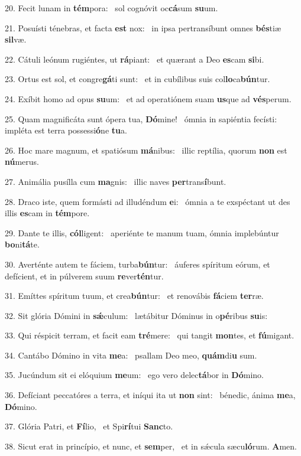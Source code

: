 20. Fecit lunam in \textbf{tém}pora: \ast\  sol cognóvit oc\textbf{cá}sum \textbf{su}um.\

21. Posuísti ténebras, et facta \textbf{est} nox: \ast\  in ipsa pertransíbunt omnes \textbf{bés}tiæ \textbf{sil}væ.\

22. Cátuli leónum rugiéntes, ut \textbf{rá}piant: \ast\  et quærant a Deo \textbf{es}cam \textbf{si}bi.\

23. Ortus est sol, et congre\textbf{gá}ti sunt: \ast\  et in cubílibus suis col\textbf{lo}ca\textbf{bún}tur.\

24. Exíbit homo ad opus \textbf{su}um: \ast\  et ad operatiónem suam \textbf{us}que ad \textbf{vés}perum.\

25. Quam magnificáta sunt ópera tua, \textbf{Dó}mine! \ast\  ómnia in sapiéntia fecísti: impléta est terra possessi\textbf{ó}ne \textbf{tu}a.\

26. Hoc mare magnum, et spatiósum \textbf{má}nibus: \ast\  illic reptília, quorum \textbf{non} est \textbf{nú}merus.\

27. Animália pusílla cum \textbf{ma}gnis: \ast\  illic naves \textbf{per}trans\textbf{í}bunt.\

28. Draco iste, quem formásti ad illudéndum \textbf{e}i: \ast\  ómnia a te exspéctant ut des illis \textbf{es}cam in \textbf{tém}pore.\

29. Dante te illis, \textbf{cól}ligent: \ast\  aperiénte te manum tuam, ómnia implebúntur \textbf{bo}ni\textbf{tá}te.\

30. Averténte autem te fáciem, turba\textbf{bún}tur: \ast\  áuferes spíritum eórum, et defícient, et in púlverem suum \textbf{re}ver\textbf{tén}tur.\

31. Emíttes spíritum tuum, et crea\textbf{bún}tur: \ast\  et renovábis \textbf{fá}ciem \textbf{ter}ræ.\

32. Sit glória Dómini in \textbf{sǽ}culum: \ast\  lætábitur Dóminus in o\textbf{pé}ribus \textbf{su}is:\

33. Qui réspicit terram, et facit eam \textbf{tré}mere: \ast\  qui tangit \textbf{mon}tes, et \textbf{fú}migant.\

34. Cantábo Dómino in vita \textbf{me}a: \ast\  psallam Deo meo, \textbf{quám}di\textbf{u} sum.\

35. Jucúndum sit ei elóquium \textbf{me}um: \ast\  ego vero delec\textbf{tá}bor in \textbf{Dó}mino.\

36. Defíciant peccatóres a terra, et iníqui ita ut \textbf{non} sint: \ast\  bénedic, ánima \textbf{me}a, \textbf{Dó}mino.\

37. Glória Patri, et \textbf{Fí}lio, \ast\  et Spi\textbf{rí}tui \textbf{Sanc}to.\

38. Sicut erat in princípio, et nunc, et \textbf{sem}per, \ast\  et in sǽcula sæcu\textbf{ló}rum. \textbf{A}men.\

